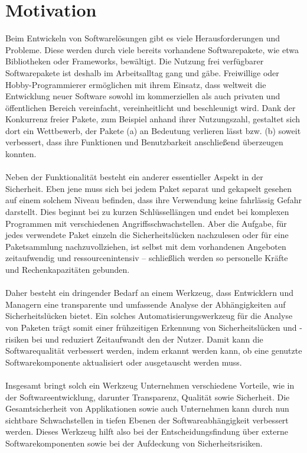 \section{Motivation} \label{subsec:Motivation}
    Beim Entwickeln von Softwarelösungen gibt es viele Herausforderungen und Probleme. 
    Diese werden durch viele bereits vorhandene Softwarepakete, wie etwa Bibliotheken oder Frameworks, bewältigt.
    Die Nutzung frei verfügbarer Softwarepakete ist deshalb im Arbeitsalltag gang und gäbe.
    Freiwillige oder Hobby-Programmierer ermöglichen mit ihrem Einsatz, dass weltweit die Entwicklung neuer Software sowohl im kommerziellen als auch privaten und öffentlichen Bereich vereinfacht, vereinheitlicht und beschleunigt wird.
    Dank der Konkurrenz freier Pakete, zum Beispiel anhand ihrer Nutzungszahl, gestaltet sich dort ein Wettbewerb, der Pakete (a) an Bedeutung verlieren lässt bzw. (b) soweit verbessert, dass ihre Funktionen und Benutzbarkeit anschließend überzeugen konnten.
    \\ \\
    Neben der Funktionalität besteht ein anderer essentieller Aspekt in der Sicherheit.
    Eben jene muss sich bei jedem Paket separat und gekapselt gesehen auf einem solchem Niveau befinden, dass ihre Verwendung keine fahrlässig Gefahr darstellt.
    Dies beginnt bei zu kurzen Schlüssellängen und endet bei komplexen Programmen mit verschiedenen Angriffsschwachstellen.
    Aber die Aufgabe, für jedes verwendete Paket einzeln die Sicherheitslücken nachzulesen oder für eine Paketsammlung nachzuvollziehen, ist selbst mit dem vorhandenen Angeboten zeitaufwendig und ressourcenintensiv -- schließlich werden so personelle Kräfte und Rechenkapazitäten gebunden.
    \\ \\
    Daher besteht ein dringender Bedarf an einem Werkzeug, dass Entwicklern und Managern eine transparente und umfassende Analyse der Abhängigkeiten auf Sicherheitslücken bietet.
    Ein solches Automatisierungswerkzeug für die Analyse von Paketen trägt somit einer frühzeitigen Erkennung von Sicherheitslücken und -risiken bei und reduziert Zeitaufwandt den der Nutzer.
    Damit kann die Softwarequalität verbessert werden, indem erkannt werden kann, ob eine genutzte Softwarekomponente aktualisiert oder ausgetauscht werden muss.
    \\ \\
    Insgesamt bringt solch ein Werkzeug Unternehmen verschiedene Vorteile, wie in der Softwareentwicklung, darunter Transparenz, Qualität sowie Sicherheit.
    Die Gesamtsicherheit von Applikationen sowie auch Unternehmen kann durch nun sichtbare Schwachstellen in tiefen Ebenen der Softwareabhängigkeit verbessert werden.
    Dieses Werkzeug hilft also bei der Entscheidungsfindung über externe Softwarekomponenten sowie bei der Aufdeckung von Sicherheitsrisiken.